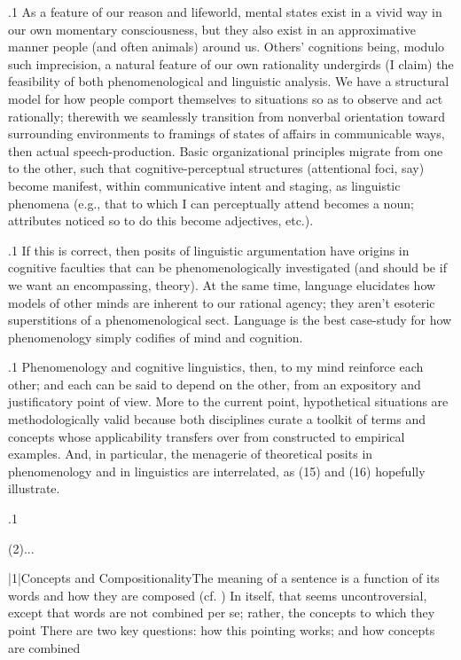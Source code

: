 \documentclass[11pt, twocolumn]{article}
\begin{document}
{{\p.1{%
As a feature of our
reason and lifeworld, mental states exist
in a vivid way in our own momentary consciousness,
but they also exist in an approximative manner
\visavis{} people (and often animals) around us.
Others' cognitions being, modulo such imprecision,
a natural feature of our own rationality undergirds
(I claim) the feasibility of both
phenomenological and linguistic analysis.
We have a
structural model for how people comport themselves
to situations so as to observe and act rationally;
therewith we seamlessly transition
from nonverbal orientation toward surrounding
environments to framings of states of affairs
in communicable ways, then actual speech-production.
Basic organizational principles migrate from one to
the other, such that cognitive-perceptual structures
(attentional foci, \pgl{}say) become manifest,
within communicative intent and staging, as
linguistic phenomena (e.g., that to which
I can perceptually attend becomes a noun; attributes
noticed so to do this become adjectives, etc.).
}%

\p.1{%
If this is correct, then posits of linguistic argumentation
have origins in cognitive faculties that can be
phenomenologically investigated (and should be if we
want an encompassing,  theory). At the
same time, language elucidates
how models of other minds are inherent to our
rational agency; they aren't esoteric superstitions
of a phenomenological sect. Language is the
best case-study for how phenomenology simply
codifies  of mind and cognition.
}%

\p.1{%
Phenomenology and cognitive linguistics, then, to
my mind reinforce each other; and each can be said
to depend on the other, from an expository
and justificatory point of view. More to the current
point, hypothetical situations are methodologically
valid because both disciplines curate a
toolkit of terms and concepts whose
applicability transfers over from constructed
to empirical examples. And, in particular, the
menagerie of theoretical posits in
phenomenology and in linguistics are interrelated,
as \exsRef(15) and \exsRef(16) hopefully illustrate. \vspace{6pt}
}%

}%

\p.1{%
\upAdj{2pt}\q{}(2).\textit{}\textit{}\q{}.\q{}\textit{}.

\s|1|{Concepts and CompositionalityThe meaning of a sentence is a function of its words and
how they are composed (cf. )  In itself, that seems uncontroversial,
except that words are not combined per se; rather,
the concepts to which they point  There are two
key questions: how this pointing works; and how
concepts are combined}

}}
\end{document}
